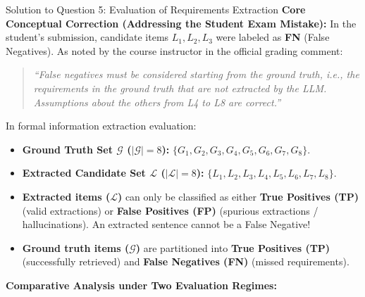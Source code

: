 \documentclass[11pt,a4paper]{article}
\begin{document}
\begin{solutionbox}{Solution to Question 5: Evaluation of Requirements Extraction}
\textbf{Core Conceptual Correction (Addressing the Student Exam Mistake):}
In the student's submission, candidate items $L_1, L_2, L_3$ were labeled as \textbf{FN} (False Negatives). As noted by the course instructor in the official grading comment:
\begin{quote}
\textit{“False negatives must be considered starting from the ground truth, i.e., the requirements in the ground truth that are not extracted by the LLM. Assumptions about the others from L4 to L8 are correct.”}
\end{quote}
In formal information extraction evaluation:
\begin{itemize}[leftmargin=1.5em]
    \item \textbf{Ground Truth Set $\mathcal{G}$ ($|\mathcal{G}| = 8$):} $\{G_1, G_2, G_3, G_4, G_5, G_6, G_7, G_8\}$.
    \item \textbf{Extracted Candidate Set $\mathcal{L}$ ($|\mathcal{L}| = 8$):} $\{L_1, L_2, L_3, L_4, L_5, L_6, L_7, L_8\}$.
    \item \textbf{Extracted items ($\mathcal{L}$)} can only be classified as either \textbf{True Positives (TP)} (valid extractions) or \textbf{False Positives (FP)} (spurious extractions / hallucinations). An extracted sentence cannot be a False Negative!
    \item \textbf{Ground truth items ($\mathcal{G}$)} are partitioned into \textbf{True Positives (TP)} (successfully retrieved) and \textbf{False Negatives (FN)} (missed requirements).
\end{itemize}

\medskip
\textbf{Comparative Analysis under Two Evaluation Regimes:}


\end{solutionbox}
\end{document}
